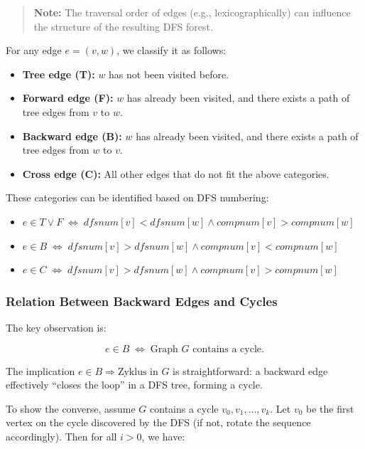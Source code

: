 \documentclass{article}
\begin{document}
\begin{quote}
\textbf{Note:} The traversal order of edges (e.g., lexicographically) can influence the structure of the resulting DFS forest.
\end{quote}

\vspace{0.5em}
\noindent
For any edge $e = (v, w)$, we classify it as follows:

\begin{itemize}
    \item \textbf{Tree edge (T):} $w$ has not been visited before.
    \item \textbf{Forward edge (F):} $w$ has already been visited, and there exists a path of tree edges from $v$ to $w$.
    \item \textbf{Backward edge (B):} $w$ has already been visited, and there exists a path of tree edges from $w$ to $v$.
    \item \textbf{Cross edge (C):} All other edges that do not fit the above categories.
\end{itemize}

\noindent
These categories can be identified based on DFS numbering:

\begin{itemize}
    \item $e \in T \lor F \;\Leftrightarrow\; dfsnum[v] < dfsnum[w] \land compnum[v] > compnum[w]$
    \item $e \in B \;\Leftrightarrow\; dfsnum[v] > dfsnum[w] \land compnum[v] < compnum[w]$
    \item $e \in C \;\Leftrightarrow\; dfsnum[v] > dfsnum[w] \land compnum[v] > compnum[w]$
\end{itemize}

\vspace{1em}
\subsubsection{Relation Between Backward Edges and Cycles}

\noindent
The key observation is:

\[
e \in B \;\Leftrightarrow\; \text{Graph } G \text{ contains a cycle.}
\]

\noindent
The implication $e \in B \Rightarrow \text{Zyklus in } G$ is straightforward:  
a backward edge effectively “closes the loop” in a DFS tree, forming a cycle.

To show the converse, assume $G$ contains a cycle $v_0, v_1, \dots, v_k$.  
Let $v_0$ be the first vertex on the cycle discovered by the DFS (if not, rotate the sequence accordingly).  
Then for all $i > 0$, we have:
\end{document}

